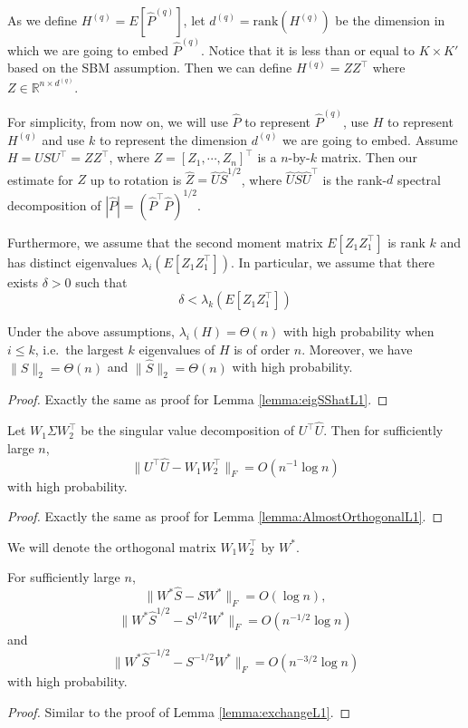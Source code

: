 As we define $H^{(q)} = E[\hat{P}^{(q)}]$, let $d^{(q)} = \mathrm{rank}(H^{(q)})$ be the dimension in which we are going to embed $\hat{P}^{(q)}$. Notice that it is less than or equal to $K\times K'$ based on the SBM assumption. Then we can define $H^{(q)} = Z Z^{\top}$ where $Z \in \mathbb{R}^{n \times d^{(q)}}$.

For simplicity, from now on, we will use $\hat{P}$ to represent $\hat{P}^{(q)}$, use $H$ to represent $H^{(q)}$ and use $k$ to represent the dimension $d^{(q)}$ we are going to embed. Assume $H = U S U^{\top} = Z Z^{\top}$, where $Z = [Z_1, \cdots, Z_n]^{\top}$ is a $n$-by-$k$ matrix. Then our estimate for $Z$ up to rotation is $\hat{Z} = \hat{U} \hat{S}^{1/2}$, where $\hat{U} \hat{S} \hat{U}^{\top}$ is the rank-$d$ spectral decomposition of $|\hat{P}| = (\hat{P}^{\top} \hat{P})^{1/2}$.

Furthermore, we assume that the second moment matrix $E[Z_1 Z_1^{\top}]$ is rank $k$ and has distinct eigenvalues $\lambda_i(E[Z_1 Z_1^{\top}])$. In particular, we assume that there exists $\delta > 0$ such that
\[
	\delta < \lambda_k(E[Z_1 Z_1^{\top}])
\]

\begin{lemma}
\label{lemma:eigSShat}
Under the above assumptions, $\lambda_i(H) = \Theta(n)$ with high probability when $i \le k$, i.e.\ the largest $k$ eigenvalues of $H$ is of order $n$. Moreover, we have $\| S \|_2 = \Theta(n)$ and $\| \hat{S} \|_2 = \Theta(n)$ with high probability.
\end{lemma}
\begin{proof}
Exactly the same as proof for Lemma \ref{lemma:eigSShatL1}.
\end{proof}

\begin{lemma}
\label{lemma:AlmostOrthogonal}
Let $W_1 \Sigma W_2^{\top}$ be the singular value decomposition of $U^{\top} \hat{U}$. Then for sufficiently large $n$, 
\[
	\| U^{\top} \hat{U} - W_1 W_2^{\top} \|_F = O(n^{-1} \log n)
\]
with high probability.
\end{lemma}
\begin{proof}
Exactly the same as proof for Lemma \ref{lemma:AlmostOrthogonalL1}.
\end{proof}

We will denote the orthogonal matrix $W_1 W_2^{\top}$ by $W^*$.
\begin{lemma}
\label{lemma:exchange}
For sufficiently large $n$,
\[
	\| W^* \hat{S} - S W^* \|_F = O(\log n),
\]
\[
	\|W^* \hat{S}^{1/2} - S^{1/2} W^* \|_F = O(n^{-1/2} \log n)
\]
and
\[
	\| W^* \hat{S}^{-1/2} - S^{-1/2} W^* \|_F = O(n^{-3/2} \log n)
\]
with high probability.
\end{lemma}
\begin{proof}
Similar to the proof of Lemma \ref{lemma:exchangeL1}.
\end{proof}

